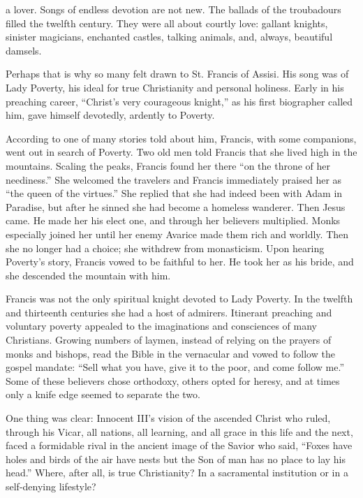 
 a lover. Songs of endless devotion are not new. The ballads of
the troubadours filled the twelfth century. They were all about courtly love: gallant knights,
sinister magicians, enchanted castles, talking animals, and, always, beautiful damsels.

Perhaps that is why so many felt drawn to St. Francis of Assisi. His song was of Lady Poverty, his
ideal for true Christianity and personal holiness. Early in his preaching career, “Christ’s very
courageous knight,” as his first biographer called him, gave himself devotedly, ardently to Poverty.

According to one of many stories told about him, Francis, with some companions, went out in search
of Poverty. Two old men told Francis that she lived high in the mountains. Scaling the peaks,
Francis found her there “on the throne of her neediness.” She welcomed the travelers and Francis
immediately praised her as “the queen of the virtues.” She replied that she had indeed been with
Adam in Paradise, but after he sinned she had become a homeless wanderer. Then Jesus came. He made
her his elect one, and through her believers multiplied. Monks especially joined her until her enemy
Avarice made them rich and worldly. Then she no longer had a choice; she withdrew from monasticism.
Upon hearing Poverty’s story, Francis vowed to be faithful to her. He took her as his bride, and she
descended the mountain with him.

Francis was not the only spiritual knight devoted to Lady Poverty. In the twelfth and thirteenth
centuries she had a host of admirers. Itinerant preaching and voluntary poverty appealed to the
imaginations and consciences of many Christians. Growing numbers of laymen, instead of relying on
the prayers of monks and bishops, read the Bible in the vernacular and vowed to follow the gospel
mandate: “Sell what you have, give it to the poor, and come follow me.” Some of these believers
chose orthodoxy, others opted for heresy, and at times only a knife edge seemed to separate the two.

One thing was clear: Innocent III’s vision of the ascended Christ who ruled, through his Vicar, all
nations, all learning, and all grace in this life and the next, faced a formidable rival in the
ancient image of the Savior who said, “Foxes have holes and birds of the air have nests but the Son
of man has no place to lay his head.” Where, after all, is true Christianity? In a sacramental
institution or in a self-denying lifestyle?

